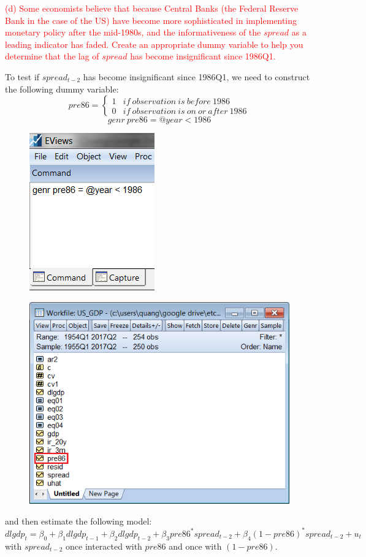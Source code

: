 \documentclass[12pt]{report}
\begin{document}
\noindent \textcolor{red}{(d) Some economists believe that because Central Banks (the Federal Reserve Bank in the case of the US) have become more sophisticated in implementing monetary policy after the mid-1980s, and the informativeness of the $spread$ as a leading indicator has faded. Create an appropriate dummy variable to help you determine that the lag of $spread$ has become insignificant since 1986Q1.}

\noindent To test if $spread_{t-2}$ has become insignificant since 1986Q1, we need to construct the following dummy variable: 
\begin{equation*}
pre86 = \begin{cases}
1 & if\ observation\ is\ before\ 1986 \\
0 & if\ observation\ is\ on\ or\ after\ 1986
\end{cases}
\end{equation*} $$genr\ pre86=@year<1986$$
\begin{figure}[H]
	\centerline{\includegraphics{tute11_47}}
\end{figure} \vspace{-\baselineskip}
\begin{figure}[H]
	\centerline{\includegraphics{tute11_48}}
\end{figure} \vspace{-\baselineskip} \noindent and then estimate the following model: $$dlgdp_t = \beta_0 + \beta_1dlgdp_{t-1} + \beta_2dlgdp_{t-2} + \beta_3pre86^*spread_{t-2} + \beta_4(1-pre86)^*spread_{t-2} + u_t$$ with $spread_{t-2}$ once interacted with $pre86$ and once with $(1-pre86)$.
\end{document}
